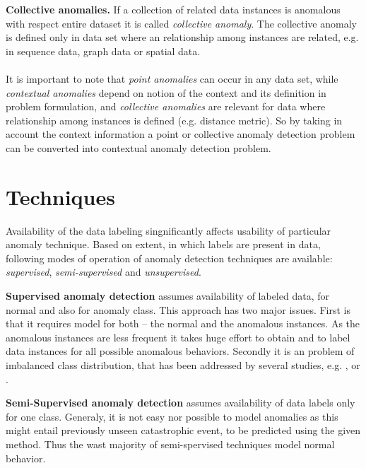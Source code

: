 
\textbf{Collective anomalies.} If a collection of related data instances is anomalous with respect
entire dataset it is called \emph{collective anomaly}. The collective anomaly is defined only 
in data set where an relationship among instances are related, e.g. in sequence data, graph data or
spatial data.
\paragraph*{}
It is important to note that \emph{point anomalies} can occur in any data set, while 
\emph{contextual anomalies} depend on notion of the context and its definition in problem formulation, 
and \emph{collective anomalies} are relevant for data where relationship among instances is defined
(e.g. distance metric). So by taking in account the context information a point or collective anomaly
detection problem can be converted into contextual anomaly detection problem.

\section{Techniques}

Availability of the data labeling singnificantly affects usability of particular anomaly technique. 
Based on extent, in which labels are present in data, following modes of operation of anomaly detection 
techniques are available: \emph{supervised}, \emph{semi-supervised} and \emph{unsupervised}.

\textbf{Supervised anomaly detection} assumes availability of labeled data, for normal and also for 
anomaly class. This approach has two major issues. First is that it requires model for both -- the normal
and the anomalous instances. As the anomalous instances are less frequent it takes huge effort to 
obtain and to label data instances for all possible anomalous behaviors. Secondly it is an problem of
imbalanced class distribution, that has been addressed by several studies, e.g. \cite{chawla2004editorial},
\cite{phua2004minority} or \cite{joshi2002predicting}.

\textbf{Semi-Supervised anomaly detection} assumes availability of data labels only for one class. 
Generaly, it is not easy nor possible to model anomalies as this might entail previously unseen 
catastrophic event, to be predicted using the given method.
Thus the wast majority of {semi-spervised} techniques model normal behavior.

